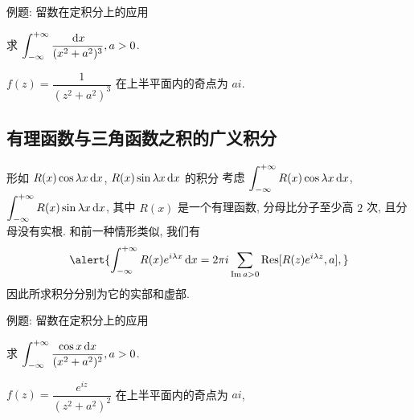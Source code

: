 \begin{frame}{例题: 留数在定积分上的应用\noexer}
	\onslide<+->
	\begin{example}
		求 $\displaystyle\int_{-\infty}^{+\infty}\frac{\,\mathrm{d} x}{(x^2+a^2)^3},a>0$.
	\end{example}

	\onslide<+->
	\begin{solution}
		$f(z)=\dfrac1{(z^2+a^2)^3}$ 在上半平面内的奇点为 $ai$.
		\vspace{-\baselineskip}
		\onslide<+->{故
			\[\int_{-\infty}^{+\infty}\frac{\diff x}{(x^2+a^2)^3}
		=2\pi i\Res[f(z),ai]=\frac{3\pi}{8a^5}.\]
		}
		\vspace{-.5\baselineskip}
	\end{solution}
\end{frame}


\subsection{有理函数与三角函数之积的广义积分}

\begin{frame}{形如 $R(x)\cos{\lambda x}\,\mathrm{d} x$,
	$R(x)\sin{\lambda x}\,\mathrm{d} x$ 的积分\noexer}
	\onslide<+->
	考虑 $\displaystyle\int_{-\infty}^{+\infty}R(x)\cos{\lambda x}\,\mathrm{d} x$,
	$\displaystyle\int_{-\infty}^{+\infty}R(x)\sin{\lambda x}\,\mathrm{d} x$, 其中 $R(x)$ 是一个有理函数, 分母比分子至少高 $2$ 次, 且分母没有实根.
	\onslide<+->
	和前一种情形类似, 我们有
	\[\alert{\int_{-\infty}^{+\infty}R(x)e^{i\lambda x}\diff x
	=2\pi i\sum_{\Im a>0}\Res[R(z)e^{i\lambda z},a],}\]
	\onslide<+->
	因此所求积分分别为它的实部和虚部.
\end{frame}


\begin{frame}{例题: 留数在定积分上的应用\noexer}
	\beqskip{2pt}
	\onslide<+->
	\begin{example}
		求 $\displaystyle\int_{-\infty}^{+\infty}\frac{\cos x\,\mathrm{d} x}{(x^2+a^2)^2}, a>0$.
	\end{example}

	\onslide<+->
	\begin{solution}
		$f(z)=\dfrac{e^{iz}}{(z^2+a^2)^2}$ 在上半平面内的奇点为 $ai$,
		\onslide<+->{
			\[\Res[f(z),ai]=\lim_{z\to ai}\left[\frac{e^{iz}}{(z+ai)^2}\right]'=-\frac{e^{-a}(a+1)i}{4a^3}.\]
		}\onslide<+->{
			\[\int_{-\infty}^{+\infty}\frac{\cos x\diff x}{(x^2+a^2)^2}=\frac{\pi e^{-a}(a+1)}{2a^3}.\]
		}
	\end{solution}
	\endgroup
\end{frame}



